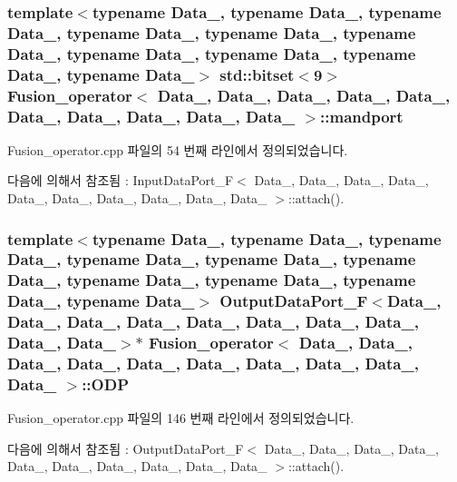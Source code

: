 \subsubsection[{\texorpdfstring{mandport}{mandport}}]{\setlength{\rightskip}{0pt plus 5cm}template$<$typename Data\+\_, typename Data\+\_, typename Data\+\_, typename Data\+\_, typename Data\+\_, typename Data\+\_, typename Data\+\_, typename Data\+\_, typename Data\+\_, typename Data\+\_$>$ std\+::bitset$<$9$>$ {\bf Fusion\+\_\+operator}$<$ Data\+\_, Data\+\_, Data\+\_, Data\+\_, Data\+\_, Data\+\_, Data\+\_, Data\+\_, Data\+\_, Data\+\_ $>$\+::mandport}\hypertarget{classFusion__operator_a1b0feb66d902358293e42a9cea02b5f7}{}\label{classFusion__operator_a1b0feb66d902358293e42a9cea02b5f7}


Fusion\+\_\+operator.\+cpp 파일의 54 번째 라인에서 정의되었습니다.



다음에 의해서 참조됨 \+:  Input\+Data\+Port\+\_\+\+F$<$ Data\+\_, Data\+\_, Data\+\_, Data\+\_, Data\+\_, Data\+\_, Data\+\_, Data\+\_, Data\+\_, Data\+\_ $>$\+::attach().

\subsubsection[{\texorpdfstring{O\+DP}{ODP}}]{\setlength{\rightskip}{0pt plus 5cm}template$<$typename Data\+\_, typename Data\+\_, typename Data\+\_, typename Data\+\_, typename Data\+\_, typename Data\+\_, typename Data\+\_, typename Data\+\_, typename Data\+\_, typename Data\+\_$>$ {\bf Output\+Data\+Port\+\_\+F}$<$Data\+\_, Data\+\_, Data\+\_, Data\+\_, Data\+\_, Data\+\_, Data\+\_, Data\+\_, Data\+\_, Data\+\_$>$$\ast$ {\bf Fusion\+\_\+operator}$<$ Data\+\_, Data\+\_, Data\+\_, Data\+\_, Data\+\_, Data\+\_, Data\+\_, Data\+\_, Data\+\_, Data\+\_ $>$\+::O\+DP}\hypertarget{classFusion__operator_a3afeb436d521b3c232ac41e26193ef3b}{}\label{classFusion__operator_a3afeb436d521b3c232ac41e26193ef3b}


Fusion\+\_\+operator.\+cpp 파일의 146 번째 라인에서 정의되었습니다.



다음에 의해서 참조됨 \+:  Output\+Data\+Port\+\_\+\+F$<$ Data\+\_, Data\+\_, Data\+\_, Data\+\_, Data\+\_, Data\+\_, Data\+\_, Data\+\_, Data\+\_, Data\+\_ $>$\+::attach().

